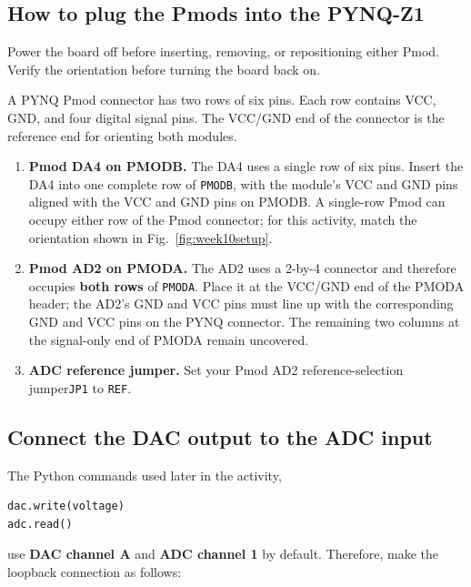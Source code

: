 \documentclass[11pt]{article}
\begin{document}
\subsection{How to plug the Pmods into the PYNQ-Z1}

Power the board off before inserting, removing, or repositioning either Pmod. Verify the orientation before turning the board back on.

A PYNQ Pmod connector has two rows of six pins. Each row contains VCC, GND, and four digital signal pins. The VCC/GND end of the connector is the reference end for orienting both modules.

\begin{enumerate}[label=\alph*)]
    \item \textbf{Pmod DA4 on PMODB.} The DA4 uses a single row of six pins. Insert the DA4 into one complete row of \texttt{PMODB}, with the module's VCC and GND pins aligned with the VCC and GND pins on PMODB. A single-row Pmod can occupy either row of the Pmod connector; for this activity, match the orientation shown in Fig.~\ref{fig:week10setup}.

    \item \textbf{Pmod AD2 on PMODA.} The AD2 uses a 2-by-4 connector and therefore occupies \textbf{both rows} of \texttt{PMODA}. Place it at the VCC/GND end of the PMODA header; the AD2's GND and VCC pins must line up with the corresponding GND and VCC pins on the PYNQ connector. The remaining two columns at the signal-only end of PMODA remain uncovered.

    \item \textbf{ADC reference jumper.} Set your Pmod AD2 reference-selection jumper\texttt{JP1} to \texttt{REF}.
\end{enumerate}

\subsection{Connect the DAC output to the ADC input}

The Python commands used later in the activity,

\begin{lstlisting}[style=python]
dac.write(voltage)
adc.read()
\end{lstlisting}

use \textbf{DAC channel A} and \textbf{ADC channel 1} by default. Therefore, make the loopback connection as follows:

\begin{center}
\end{center}
\end{document}
